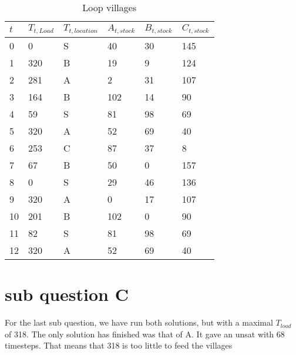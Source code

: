 \begin{table}[]
	\centering
	\caption{Loop villages}
	\label{table:LoopVillages}
	\begin{tabular}{@{}llllll@{}}
		\toprule
		$t$ & $T_{t,Load}$ & $T_{t,location}$ & $A_{t,stock}$ & $B_{t,stock}$ & $C_{t,stock}$ \\ \midrule
		0        & 0     & S    & 40     & 30     & 145    \\
		1        & 320   & B    & 19     & 9      & 124    \\
		2        & 281   & A    & 2      & 31     & 107    \\
		3        & 164   & B    & 102    & 14     & 90     \\
		4        & 59    & S    & 81     & 98     & 69     \\
		\rowcolor[HTML]{FE996B} 
		5        & 320   & A    & 52     & 69     & 40     \\
		6        & 253   & C    & 87     & 37     & 8      \\
		7        & 67    & B    & 50     & 0      & 157    \\
		8        & 0     & S    & 29     & 46     & 136    \\
		9        & 320   & A    & 0      & 17     & 107    \\
		10       & 201   & B    & 102    & 0      & 90     \\
		11       & 82    & S    & 81     & 98     & 69     \\
		\rowcolor[HTML]{FE996B} 
		12       & 320   & A    & 52     & 69     & 40     \\ \bottomrule
	\end{tabular}
\end{table}

\section{sub question C}
For the last sub question, we have run both solutions, but with a maximal $T_{load}$ of 318. The only solution has finished was that of A. It gave an unsat with 68 timesteps. That means that 318 is too little to feed the villages 
